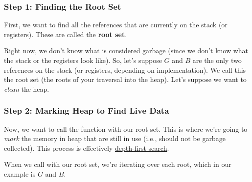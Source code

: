 \subsubsection{Step 1: Finding the Root Set}
\begin{mdframed}
    First, we want to find all the references that are currently on the stack (or registers). These are called the \textbf{root set}.
\end{mdframed}
Right now, we don't know what is considered garbage (since we don't know what the stack or the registers look like). So, let's suppose $G$ and $B$ are the only two references on the stack (or registers, depending on implementation). We call this the root set (the roots of your traversal into the heap). Let's suppose we want to \emph{clean} the heap. 

\subsubsection{Step 2: Marking Heap to Find Live Data}
\begin{mdframed}
    Now, we want to call the  function with our root set. This is where we're going to \emph{mark} the memory in heap that are still in use (i.e., should not be garbage collected). This process is effectively \underline{depth-first search}.
\end{mdframed}
When we call  with our root set, we're iterating over each root, which in our example is $G$ and $B$. 
